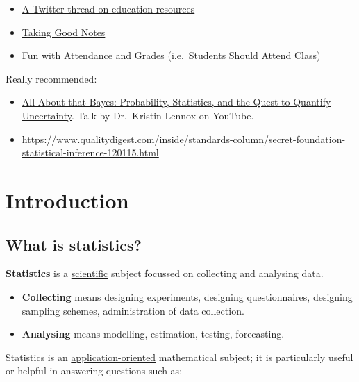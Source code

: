 \documentclass[
]{book}
\providecommand{\tightlist}{%
  \setlength{\itemsep}{0pt}\setlength{\parskip}{0pt}}
\theoremstyle{definition}
\theoremstyle{definition}
\theoremstyle{definition}
\theoremstyle{definition}
\theoremstyle{remark}
\begin{document}
\begin{itemize}
\tightlist
\item
  \href{https://twitter.com/danialAhamdani/status/1332679355756003332}{A Twitter thread on education resources}
\item
  \href{http://svmiller.com/blog/2014/09/taking-good-notes/}{Taking Good Notes}
\item
  \href{http://svmiller.com/blog/2016/05/fun-with-attendance-grades/}{Fun with Attendance and Grades (i.e.~Students Should Attend Class)}
\end{itemize}

Really recommended:

\begin{itemize}
\item
  \href{https://youtu.be/eDMGDhyDxuY}{All About that Bayes: Probability, Statistics, and the Quest to Quantify Uncertainty}. Talk by Dr.~Kristin Lennox on YouTube.
\item
  \url{https://www.qualitydigest.com/inside/standards-column/secret-foundation-statistical-inference-120115.html}
\end{itemize}

\hypertarget{part-introduction}{%
\part{Introduction}\label{part-introduction}}

\hypertarget{what-is-statistics}{%
\chapter*{What is statistics?}\label{what-is-statistics}}

\textbf{Statistics} is a \uline{scientific} subject focussed on collecting and analysing data.

\begin{itemize}
\tightlist
\item
  \textbf{Collecting} means designing experiments, designing
  questionnaires, designing sampling schemes, administration of data
  collection.
\item
  \textbf{Analysing} means modelling, estimation, testing, forecasting.
\end{itemize}

Statistics is an \uline{application-oriented} mathematical subject; it is
particularly useful or helpful in answering questions such as:
\end{document}
